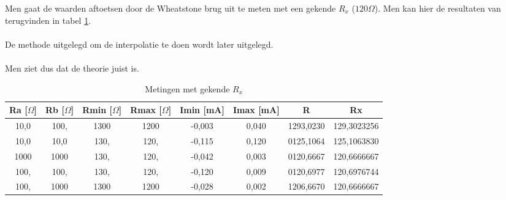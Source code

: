 Men gaat de waarden aftoetsen door de Wheatstone brug uit te
meten met een gekende $R_x$ ($120\Omega$). Men kan hier de resultaten van
terugvinden in tabel \ref{tab:aftoets_theorie}.
\\ \\
De methode uitgelegd om de interpolatie te doen wordt later
uitgelegd.
\\ \\
Men ziet dus dat de theorie juist is.

\begin{table}
    \centering
    \caption{Metingen met gekende $R_x$}
    \label{tab:aftoets_theorie}
    \begin{tabular}{| c | c | c | c | c | c | c | c |}
        \hline
        Ra [$\Omega$]	& Rb [$\Omega$] & Rmin [$\Omega$]   & Rmax [$\Omega$]   & Imin [mA] & Imax [mA] & R & Rx \\ \hline
        10,0            & 100,          & 1300              & 1200              & -0,003    & 0,040     & 1293,0230 & 129,3023256 \\ \hline
        10,0            & 10,0          & 130,              & 120,              & -0,115    & 0,120     & 0125,1064 & 125,1063830 \\ \hline
        1000            & 1000          & 130,              & 120,              & -0,042    & 0,003     & 0120,6667 & 120,6666667 \\ \hline
        100,            & 100,          & 130,              & 120,              & -0,120    & 0,009     & 0120,6977 & 120,6976744 \\ \hline
        100,            & 1000          & 1300              & 1200              & -0,028    & 0,002     & 1206,6670 & 120,6666667 \\ \hline
    \end{tabular}
\end{table}


